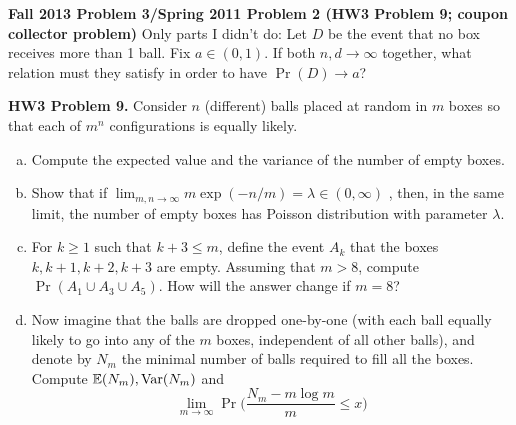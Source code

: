 \textbf{Fall 2013 Problem 3/Spring 2011 Problem 2 (HW3 Problem 9; coupon collector problem)} Only parts I didn't do:  Let \(D\) be the event that no box receives more than 1 ball. Fix \(a \in (0,1)\). If both \(n, d \to \infty\) together, what relation must they satisfy in order to have \(\Pr(D) \to a\)?

\textbf{HW3 Problem 9.} Consider \(n\) (different) balls placed at random in \(m\) boxes so that each of \(m^n\) configurations is equally likely.

\begin{enumerate}[(a)]

\item Compute the expected value and the variance of the number of empty boxes.

\item Show that if \(\lim_{m, n \to \infty} m \exp(-n/m) = \lambda \in (0, \infty)\) , then, in the same limit, the number of empty boxes has Poisson distribution with parameter \(\lambda\). 
\item For \(k \geq 1\) such that \(k + 3 \leq m\), define the event \(A_k\) that the boxes \(k, k+1, k+2, k+3\) are empty. Assuming that \(m > 8\), compute \(\Pr(A_1 \cup A_3 \cup A_5)\). How will the answer change if \(m = 8\)?

\item Now imagine that the balls are dropped one-by-one (with each ball equally likely to go into any of the \(m\) boxes, independent of all other balls), and denote by \(N_m\) the minimal number of balls required to fill all the boxes. Compute \(\E(N_m), \Var(N_m)\) and \[ \lim_{m \to \infty} \Pr \bigg( \frac{N_m - m \log m}{m} \leq x \bigg) \]

\end{enumerate}

